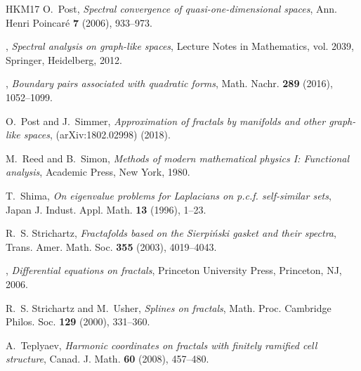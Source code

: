 \documentclass[12pt,reqno,a4paper]{amsart}            %
\numberwithin{equation}{section}
\theoremstyle{mythmstyle}       %
\theoremstyle{mydefstyle}        %
\newcommand{\1}{\mathbbm 1}                    %
\begin{document}
\begin{thebibliography}{HKM{\etalchar{+}}17}
O.~Post, \emph{Spectral convergence of quasi-one-dimensional spaces}, Ann.
  Henri Poincar\'e \textbf{7} (2006), 933--973.

\bysame, \emph{Spectral analysis on graph-like spaces}, Lecture Notes in
  Mathematics, vol. 2039, Springer, Heidelberg, 2012.

\bysame, \emph{Boundary pairs associated with quadratic forms}, Math. Nachr.
  \textbf{289} (2016), 1052--1099.

O.~Post and J.~Simmer, \emph{Approximation of fractals by manifolds and other graph-like spaces}, (arXiv:1802.02998) (2018).

M.~Reed and B.~Simon, \emph{{Methods of modern mathematical physics I:
  Functional analysis}}, Academic Press, New York, 1980.

T.~Shima, \emph{On eigenvalue problems for {L}aplacians on p.c.f. self-similar
  sets}, Japan J. Indust. Appl. Math. \textbf{13} (1996), 1--23.

R.~S. Strichartz, \emph{Fractafolds based on the {S}ierpi\'nski gasket and
  their spectra}, Trans. Amer. Math. Soc. \textbf{355} (2003), 4019--4043.

\bysame, \emph{Differential equations on fractals}, Princeton University Press,
  Princeton, NJ, 2006.

R.~S. Strichartz and M.~Usher, \emph{Splines on fractals}, Math. Proc.
  Cambridge Philos. Soc. \textbf{129} (2000), 331--360.

A.~Teplyaev, \emph{Harmonic coordinates on fractals with finitely ramified cell
  structure}, Canad. J. Math. \textbf{60} (2008), 457--480.
\end{thebibliography}

%
%

\end{document}
